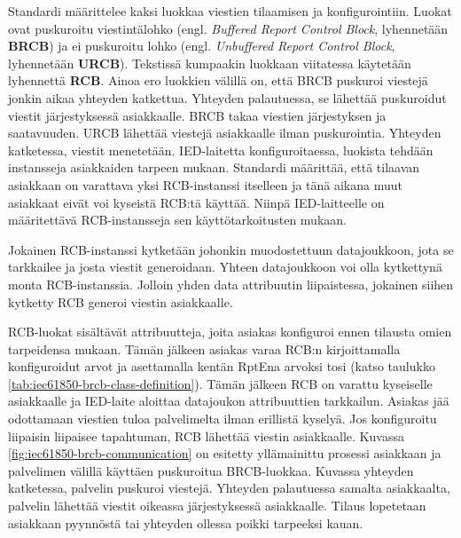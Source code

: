 Standardi määrittelee kaksi luokkaa viestien tilaamisen ja konfigurointiin. Luokat ovat puskuroitu viestintälohko (engl. \emph{Buffered Report Control Block}, lyhennetään \textbf{BRCB}) ja ei puskuroitu lohko (engl. \emph{Unbuffered Report Control Block}, lyhennetään \textbf{URCB}). Tekstissä kumpaakin luokkaan viitatessa käytetään lyhennettä \textbf{RCB}. Ainoa ero luokkien välillä on, että BRCB puskuroi viestejä jonkin aikaa yhteyden katkettua. Yhteyden palautuessa, se lähettää puskuroidut viestit järjestyksessä asiakkaalle. BRCB takaa viestien järjestyksen ja saatavuuden. URCB lähettää viestejä asiakkaalle ilman puskurointia. Yhteyden katketessa, viestit menetetään. IED-laitetta konfiguroitaessa, luokista tehdään instansseja asiakkaiden tarpeen mukaan. Standardi määrittää, että tilaavan asiakkaan on varattava yksi RCB-instanssi itselleen ja tänä aikana muut asiakkaat eivät voi kyseistä RCB:tä käyttää. Niinpä IED-laitteelle on määritettävä RCB-instansseja sen käyttötarkoitusten mukaan.

Jokainen RCB-instanssi kytketään johonkin muodostettuun datajoukkoon, jota se tarkkailee ja josta viestit generoidaan. Yhteen datajoukkoon voi olla kytkettynä monta RCB-instanssia. Jolloin yhden data attribuutin liipaistessa, jokainen siihen kytketty RCB generoi viestin asiakkaalle.

RCB-luokat sisältävät attribuutteja, joita asiakas konfiguroi ennen tilausta omien tarpeidensa mukaan. Tämän jälkeen asiakas varaa RCB:n kirjoittamalla konfiguroidut arvot ja asettamalla kentän RptEna arvoksi tosi (katso taulukko \ref{tab:iec61850-brcb-class-definition}). Tämän jälkeen RCB on varattu kyseiselle asiakkaalle ja IED-laite aloittaa datajoukon attribuuttien tarkkailun. Asiakas jää odottamaan viestien tuloa palvelimelta ilman erillistä kyselyä. Jos konfiguroitu liipaisin liipaisee tapahtuman, RCB lähettää viestin asiakkaalle. Kuvassa \ref{fig:iec61850-brcb-communication} on esitetty yllämainittu prosessi asiakkaan ja palvelimen välillä käyttäen puskuroitua BRCB-luokkaa. Kuvassa yhteyden katketessa, palvelin puskuroi viestejä. Yhteyden palautuessa samalta asiakkaalta, palvelin lähettää viestit oikeassa järjestyksessä asiakkaalle. Tilaus lopetetaan asiakkaan pyynnöstä tai yhteyden ollessa poikki tarpeeksi kauan.


